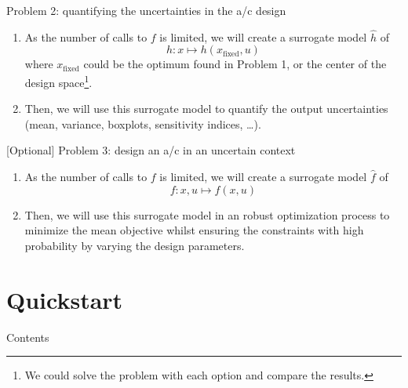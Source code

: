 \documentclass[aspectratio=169]{beamer}
\begin{document}
\begin{frame}{Problem 2: quantifying the uncertainties in the a/c design}
    \begin{enumerate}
        \item As the number of calls to $f$ is limited,
              we will create a surrogate model $\hat{h}$ of $$h:x\mapsto h(x_{\textrm{fixed}},u)$$
              where $x_{\textrm{fixed}}$ could be the optimum found in Problem 1,
              or the center of the design space\footnote{We could solve the problem with each option and compare the results.}.
        \item Then,
              we will use this surrogate model to quantify the output uncertainties (mean, variance, boxplots, sensitivity indices, \ldots).
    \end{enumerate}
\end{frame}
\begin{frame}{[Optional] Problem 3: design an a/c in an uncertain context}
    \begin{enumerate}
        \item As the number of calls to $f$ is limited,
              we will create a surrogate model $\hat{f}$ of $$f:x,u\mapsto f(x,u)$$
        \item Then,
              we will use this surrogate model in an robust optimization process to minimize the mean objective whilst ensuring the constraints with high probability by varying the design parameters.
    \end{enumerate}
\end{frame}

\section{Quickstart}

\begin{frame}{Contents}
    \tableofcontents[currentsection]
\end{frame}
\end{document}
